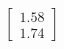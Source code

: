 \documentclass[preview]{standalone}
\begin{document}
\begin{align*}
\begin{bmatrix} 1.58 \\ 1.74 \end{bmatrix}
\end{align*}
\end{document}
